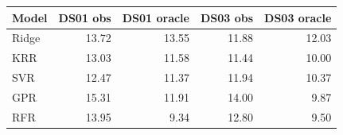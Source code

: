 \begin{tabular}{lrrrr}
\toprule
Model & DS01 obs & DS01 oracle & DS03 obs & DS03 oracle \\
\midrule
Ridge & 13.72 & 13.55 & 11.88 & 12.03 \\
KRR & 13.03 & 11.58 & 11.44 & 10.00 \\
SVR & 12.47 & 11.37 & 11.94 & 10.37 \\
GPR & 15.31 & 11.91 & 14.00 & 9.87 \\
RFR & 13.95 & 9.34 & 12.80 & 9.50 \\
\bottomrule
\end{tabular}

